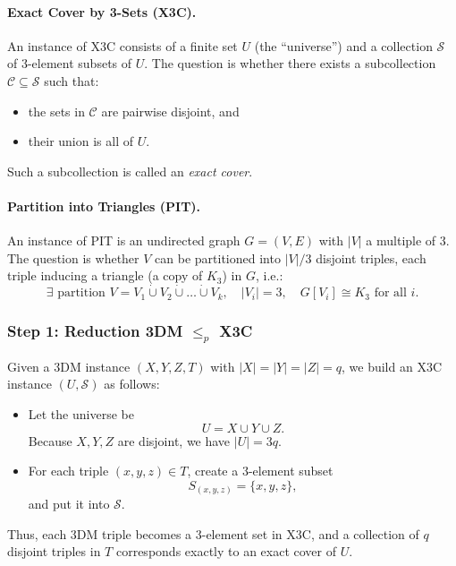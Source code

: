 \documentclass[9pt]{extarticle}
\begin{document}
\paragraph{Exact Cover by 3-Sets (X3C).}
An instance of X3C consists of a finite set $U$ (the ``universe'') and a
collection $\mathcal{S}$ of 3-element subsets of $U$.  The question is whether
there exists a subcollection $\mathcal{C} \subseteq \mathcal{S}$ such that:
\begin{itemize}
    \item the sets in $\mathcal{C}$ are pairwise disjoint, and
    \item their union is all of $U$.
\end{itemize}
Such a subcollection is called an \emph{exact cover}.

\paragraph{Partition into Triangles (PIT).}
An instance of PIT is an undirected graph $G = (V, E)$ with $|V|$ a multiple
of $3$.  The question is whether $V$ can be partitioned into $|V|/3$ disjoint
triples, each triple inducing a triangle (a copy of $K_3$) in $G$, i.e.:
\[
\exists \text{ partition } V = V_1 \dot\cup V_2 \dot\cup \dots \dot\cup V_k,
\quad |V_i| = 3, \quad G[V_i] \cong K_3 \text{ for all } i.
\]

\subsubsection*{Step 1: Reduction \textsc{3DM} {$\le_p$} \textsc{X3C}}

Given a 3DM instance $(X, Y, Z, T)$ with $|X|=|Y|=|Z|=q$, we build an X3C
instance $(U, \mathcal{S})$ as follows:

\begin{itemize}
    \item Let the universe be
    \[
        U = X \cup Y \cup Z.
    \]
    Because $X, Y, Z$ are disjoint, we have $|U| = 3q$.

    \item For each triple $(x, y, z) \in T$, create a 3-element subset
    \[
        S_{(x,y,z)} = \{x, y, z\},
    \]
    and put it into $\mathcal{S}$.
\end{itemize}

Thus, each 3DM triple becomes a 3-element set in X3C, and a collection
of $q$ disjoint triples in $T$ corresponds exactly to an exact cover of $U$.
\end{document}

